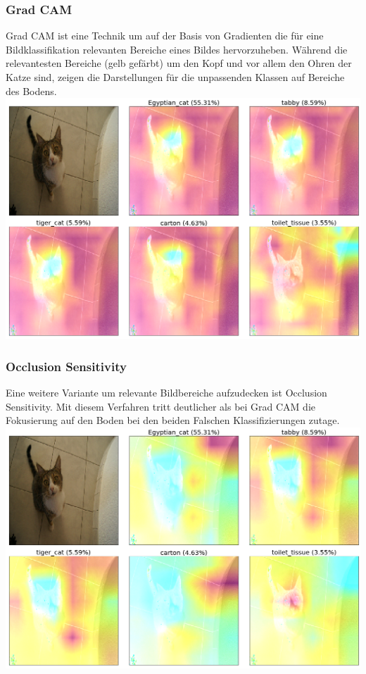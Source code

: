\documentclass[
  12pt, %
  a4paper, %
  oneside, %
  openany, 
  numbers=noenddot, %
  BCOR=5mm, %
  parskip=half*, %
  thesis, %
]{bfhbook}
\begin{document}
\subsubsection*{Grad CAM} \break
\Gls{Grad CAM} ist eine Technik \parencite{Selvaraju2016} um auf der Basis von Gradienten die für eine Bildklassifikation relevanten Bereiche eines Bildes hervorzuheben. Während die relevantesten Bereiche (gelb gefärbt) um den Kopf und vor allem den Ohren der Katze sind, zeigen die Darstellungen für die unpassenden Klassen auf Bereiche des Bodens.
\includegraphics[width=\textwidth]{Bilder/Grad-Cam-Classes.png}

\subsubsection*{Occlusion Sensitivity} \break
Eine weitere Variante um relevante Bildbereiche aufzudecken ist Occlusion Sensitivity. Mit diesem Verfahren tritt deutlicher als bei Grad CAM die Fokusierung auf den Boden bei den beiden Falschen Klassifizierungen zutage.
\includegraphics[width=\textwidth]{Bilder/OcclusionSensitivity-Classes.png}
\end{document}

